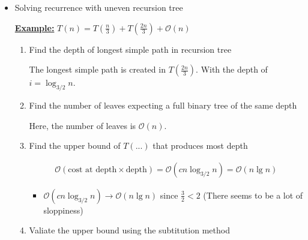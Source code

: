 \documentclass[12pt]{article}
\begin{document}
\begin{enumerate}[1.]
    \begin{itemize}
        \item Solving recurrence with uneven recursion tree

        \bigskip

        \underline{\textbf{Example:}} $T(n) = T(\frac{n}{3}) + T(\frac{2n}{3}) + \mathcal{O}(n)$

        \bigskip

        \begin{enumerate}[1.]
            \item Find the depth of longest simple path in recursion tree

            \bigskip

            \color{red}
            The longest simple path is created in $T(\frac{2n}{3})$. With the depth of
            $i = \log_{3/2} n$.
            \color{black}

            \bigskip

            \item Find the number of leaves expecting a full binary tree of the same depth

            \bigskip

            \color{red}
            Here, the number of leaves is $\mathcal{O}(n)$.
            \color{black}

            \bigskip

            \item Find the upper bound of $T(...)$ that produces most depth

            \color{red}

            \begin{align*}
                \mathcal{O}( \text{cost at depth} \times \text{depth}) = \mathcal{O}(cn \log_{3/2} n) = \mathcal{O}(n\lg n)
            \end{align*}

            \color{black}

            \bigskip

            \begin{itemize}
                \item $\mathcal{O}(cn \log_{3/2} n) \to \mathcal{O}(n\lg n)$ since $\frac{3}{2} < 2$ (There seems to be a lot of sloppiness)
            \end{itemize}

            \bigskip

            \item Valiate the upper bound using the subtitution method


\end{enumerate}
\end{itemize}
\end{enumerate}
\end{document}
